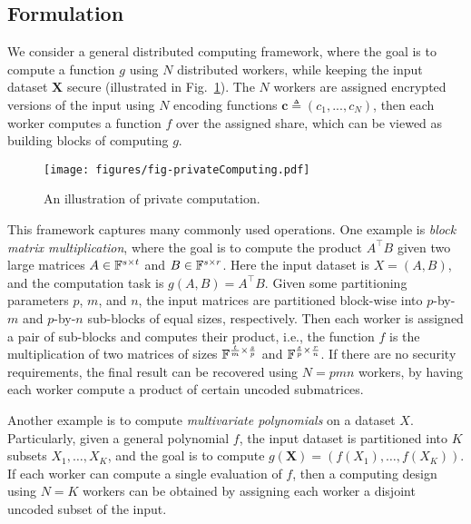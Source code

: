 \subsection{Formulation}



We consider a general distributed computing framework, where the goal is to compute a function $g$ using $N$ distributed workers, while keeping the input dataset $\boldsymbol{X}$ secure (illustrated in Fig.~\ref{fig:overview}). 
The $N$ workers are assigned encrypted versions of the input using $N$ encoding functions $\boldsymbol{c}\triangleq (c_1,...,c_N)$, 
then each worker computes a function $f$ over the assigned share, which can be viewed as building blocks of computing $g$.

\begin{figure}[t]
\centering
\texttt{[image: figures/fig-privateComputing.pdf]}
\caption{An illustration of private computation. %
}
\label{fig:overview}
\end{figure}

This framework captures many commonly used operations.  One example is \emph{block matrix multiplication}, where the goal is to compute the product $A^\intercal B$ given two large matrices $A\in \mathbb{F}^{s\times t}$ and $B\in \mathbb{F}^{s\times r}$. 
Here the input dataset is $X=(A,B)$, and the computation task is $g(A,B)=A^\intercal B$. Given some partitioning parameters $p$, $m$, and $n$, the input matrices are partitioned block-wise into $p$-by-$m$ and $p$-by-$n$ sub-blocks of equal sizes, respectively. Then each worker is assigned a pair of sub-blocks and computes their product, i.e., the function $f$ is the multiplication of two matrices of sizes $\mathbb{F}^{\frac{t}{m}\times \frac{s}{p}}$ and $\mathbb{F}^{\frac{s}{p}\times \frac{r}{n}}$. If there are no security requirements, the final result can be recovered using $N=pmn$ workers, by having each worker compute a  product of certain uncoded submatrices. 


Another example is to compute \emph{multivariate polynomials} on a dataset $X$. Particularly, given a general polynomial $f$, the input dataset is partitioned into $K$ subsets $X_1,\ldots,X_K$, and the goal is to compute $g(\boldsymbol{X})=(f(X_1),\ldots,f(X_K))$. If each worker can compute a single evaluation of $f$, then a computing design using $N=K$ workers can be obtained by assigning each worker a disjoint uncoded subset of the input.

